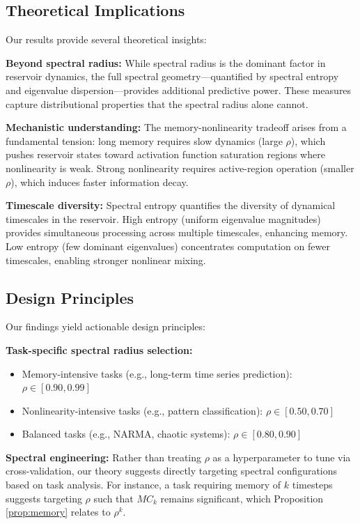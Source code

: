 \documentclass{article}
\begin{document}
\subsection{Theoretical Implications}

Our results provide several theoretical insights:

\textbf{Beyond spectral radius:} While spectral radius is the dominant factor in reservoir dynamics, the full spectral geometry—quantified by spectral entropy and eigenvalue dispersion—provides additional predictive power. These measures capture distributional properties that the spectral radius alone cannot.

\textbf{Mechanistic understanding:} The memory-nonlinearity tradeoff arises from a fundamental tension: long memory requires slow dynamics (large $\rho$), which pushes reservoir states toward activation function saturation regions where nonlinearity is weak. Strong nonlinearity requires active-region operation (smaller $\rho$), which induces faster information decay.

\textbf{Timescale diversity:} Spectral entropy quantifies the diversity of dynamical timescales in the reservoir. High entropy (uniform eigenvalue magnitudes) provides simultaneous processing across multiple timescales, enhancing memory. Low entropy (few dominant eigenvalues) concentrates computation on fewer timescales, enabling stronger nonlinear mixing.

\subsection{Design Principles}

Our findings yield actionable design principles:

\textbf{Task-specific spectral radius selection:}
\begin{itemize}
    \item Memory-intensive tasks (e.g., long-term time series prediction): $\rho \in [0.90, 0.99]$
    \item Nonlinearity-intensive tasks (e.g., pattern classification): $\rho \in [0.50, 0.70]$
    \item Balanced tasks (e.g., NARMA, chaotic systems): $\rho \in [0.80, 0.90]$
\end{itemize}

\textbf{Spectral engineering:} Rather than treating $\rho$ as a hyperparameter to tune via cross-validation, our theory suggests directly targeting spectral configurations based on task analysis. For instance, a task requiring memory of $k$ timesteps suggests targeting $\rho$ such that $MC_k$ remains significant, which Proposition \ref{prop:memory} relates to $\rho^k$.
\end{document}
